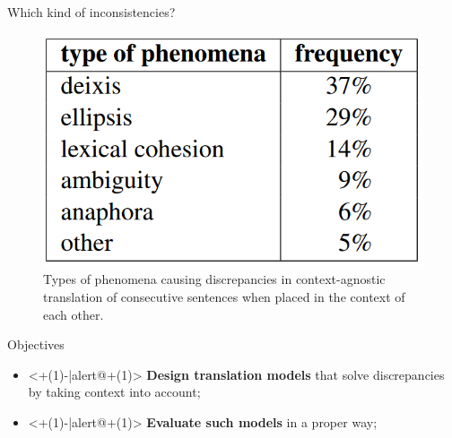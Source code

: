 \begin{frame}{Which kind of inconsistencies?}
	\begin{figure}
		\centering
		\includegraphics[width=0.7\linewidth]{Images/phenomena}
		\caption{Types of phenomena causing discrepancies in context-agnostic  translation  of  consecutive  sentences when placed in the context of each other.}
		\label{fig:phenomena}
	\end{figure}	
\end{frame}

\begin{frame}{Objectives}
	\begin{itemize}
		\item<+(1)-|alert@+(1)> \textbf{Design translation models} that solve discrepancies by taking context into account;
		\item<+(1)-|alert@+(1)> \textbf{Evaluate such models} in a proper way;
	\end{itemize}
	
\end{frame}
